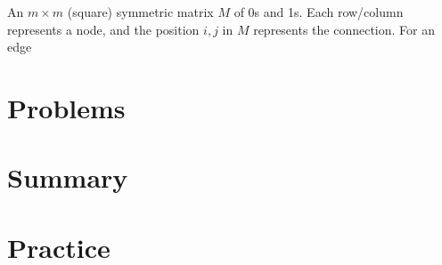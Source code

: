 \documentclass[main.tex]{subfiles}
\begin{document}
\begin{defn}
	An \(m \times m\) (square) symmetric matrix \(M\) of 0s and 1s. Each row/column represents a node, and the position \(i,j\) in \(M\) represents the connection. For an edge 
\end{defn}

\section{Problems}

\section{Summary}

\section{Practice}
\end{document}
